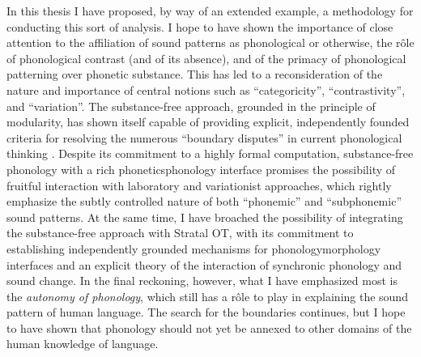 In this thesis I have proposed, by way of an extended example, a methodology for conducting this sort of analysis. I hope to have shown the importance of close attention to the affiliation of sound patterns as phonological or otherwise, the rôle of phonological contrast (and of its absence), and of the primacy of phonological patterning over phonetic substance. This has led to a reconsideration of the nature and importance of central notions such as \enquote{categoricity}, \enquote{contrastivity}, and \enquote{variation}. The substance\hyp free approach, grounded in the principle of modularity, has shown itself capable of providing explicit, independently founded criteria for resolving the numerous \enquote{boundary disputes} in current phonological thinking \citep{myers-phonoknowledge,cohn06:_is,cohn11:_featur,scobbie07:_inter}. Despite its commitment to a highly formal computation, substance\hyp free phonology with a rich phonetics\endash phonology interface promises the possibility of fruitful interaction with laboratory and variationist approaches, which rightly emphasize the subtly controlled nature of both \enquote{phonemic} and \enquote{subphonemic} sound patterns. At the same time, I have broached the possibility of integrating the substance\hyp free approach with Stratal OT, with its commitment to establishing independently grounded mechanisms for phonology\endash morphology interfaces and an explicit theory of the interaction of synchronic phonology and sound change. In the final reckoning, however, what I have emphasized most is the \emph{autonomy of phonology}, which still has a rôle to play in explaining the sound pattern of human language. The search for the boundaries continues, but I hope to have shown that phonology should not yet be annexed to other domains of the human knowledge of language.